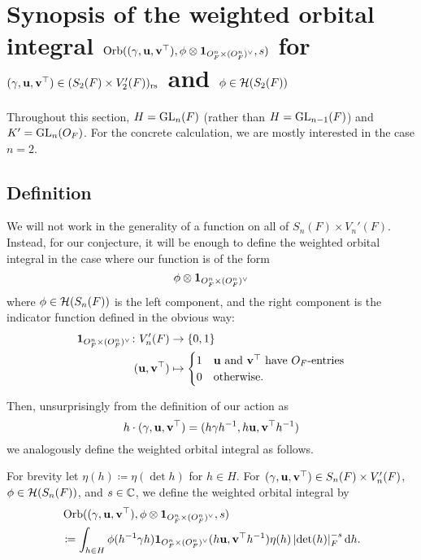 \chapter{Synopsis of the weighted orbital integral
  $\operatorname{Orb}((\gamma, \mathbf u, \mathbf v^\top), \phi \otimes \mathbf{1}_{O_F^n \times (O_F^n)^\vee}, s)$
  for $(\gamma, \mathbf u, \mathbf v^\top) \in (S_2(F) \times V'_2(F))_{\mathrm{rs}}$
  and $\phi \in \mathcal H(S_2(F))$}
\label{ch:orbitalFJ0}

Throughout this section, $H = \operatorname{GL}_n(F)$ (rather than $H = \operatorname{GL}_{n-1}(F)$)
and $K' = \operatorname{GL}_n(O_F)$.
For the concrete calculation, we are mostly interested in the case $n = 2$.

\section{Definition}
We will not work in the generality of a function on all of $S_n(F) \times V_n'(F)$.
Instead, for our conjecture, it will be enough to define the weighted orbital integral
in the case where our function is of the form
\[ \phi \otimes \mathbf{1}_{O_F^n \times (O_F^n)^\vee} \]
where $\phi \in \mathcal H(S_n(F))$ is the left component, and
the right component is the indicator function defined in the obvious way:
\begin{align*}
  \mathbf{1}_{O_F^n \times (O_F^n)^\vee} \colon V'_n(F) &\to \{0,1\} \\
  (\mathbf u, \mathbf v^\top) &\mapsto
  \begin{cases}
    1 & \mathbf u \text{ and } \mathbf v^\top \text{ have } O_F \text{-entries} \\
    0 & \text{otherwise}.
  \end{cases}
\end{align*}

Then, unsurprisingly from the definition of our action as
\[ h \cdot {(\gamma, \mathbf u, \mathbf v^\top)} = (h\gamma h^{-1}, h\mathbf u, \mathbf v^\top h^{-1}) \]
we analogously define the weighted orbital integral as follows.
\begin{definition}
  \label{def:orbitalFJ}
  For brevity let $\eta(h) \coloneqq \eta(\det h)$ for $h \in H$.
  For ${(\gamma, \mathbf u, \mathbf v^\top)} \in S_n(F) \times V'_n(F)$,
  $\phi \in \mathcal H(S_n(F))$, and $s \in \mathbb C$,
  we define the weighted orbital integral by
  \begin{align*}
    & \Orb((\gamma, \uu, \vv^\top), \phi \otimes \oneV, s) \\
    &\coloneqq \int_{h \in H} \phi(h\inv \gamma h) \oneV(h \uu, \vv^\top h^{-1})
    \eta(h) \left\lvert \det(h) \right\rvert_F^{-s} \odif h.
  \end{align*}
\end{definition}

